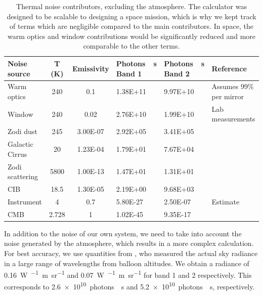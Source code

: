 \renewcommand{\arraystretch}{1.5}
\def\labelitemi{--}
\begin{table}[!h]
\small
\begin{longtable}{P{2.5cm}ccP{2cm}P{2cm}p{3cm}}
\toprule
Noise source	&		T (K)		&		Emissivity		&		Photons~\si{\per\second} Band 1		&		Photons~\si{\per\second} Band 2		&	Reference	 \\
\midrule
Warm optics	&	\num{	240	}	&	\num{	0.1	}	&	\num{	1.38E+11	}	&	\num{	9.97E+10	}	&	Assumes 99\% per mirror	\\
Window	&	\num{	240	}	&	\num{	0.02	}	&	\num{	2.76E+10	}	&	\num{	1.99E+10	}	&	Lab measurements	\\
Zodi dust	&	\num{	245	}	&	\num{	3.00E-07	}	&	\num{	2.92E+05	}	&	\num{	3.41E+05	}	&	\cite{Fixsen:2002da}	\\
Galactic Cirrus	&	\num{	20	}	&	\num{	1.23E-04	}	&	\num{	1.79E+01	}	&	\num{	7.67E+04	}	&	\cite{Bracco:2011gw}	\\
Zodi scattering	&	\num{	5800	}	&	\num{	1.00E-13	}	&	\num{	1.47E+01	}	&	\num{	1.31E+01	}	&	\cite{Fixsen:2002da}	\\
CIB	&	\num{	18.5	}	&	\num{	1.30E-05	}	&	\num{	2.19E+00	}	&	\num{	9.68E+03	}	&	\cite{Fixsen:1998br}	\\
Instrument	&	\num{	4	}	&	\num{	0.7	}	&	\num{	5.80E-27	}	&	\num{	2.50E-07	}	&	Estimate	\\
CMB	&	\num{	2.728	}	&	\num{	1	}	&	\num{	1.02E-45	}	&	\num{	9.35E-17	}	&	\cite{Fixsen:1996di}	\\
\bottomrule
\end{longtable}
\caption[Thermal noise contributors]{Thermal noise contributors, excluding the atmosphere. The calculator was designed to be scalable to designing a space mission, which is why we kept track of terms which are negligible compared to the main contributors. In space, the warm optics and window contributions would be significantly reduced and more comparable to the other terms.}
\label{tab:noiseparams}
\end{table}

In addition to the noise of our own system, we need to take into account the noise generated by the atmosphere, which results in a more complex calculation. For best accuracy, we use quantities from \cite{Harries:1980cva}, who measured the actual sky radiance in a large range of wavelengths from balloon altitudes. We obtain a radiance of \SI{0.16}{\watt\per{}\meter\per\steradian} and \SI{0.07}{\watt\per{}\meter\per\steradian} for band 1 and 2 respectively. This corresponds to \num{2.6e10}~photons~\si{\per\second} and \num{5.2e10}~photons~\si{\per\second}, respectively. 


